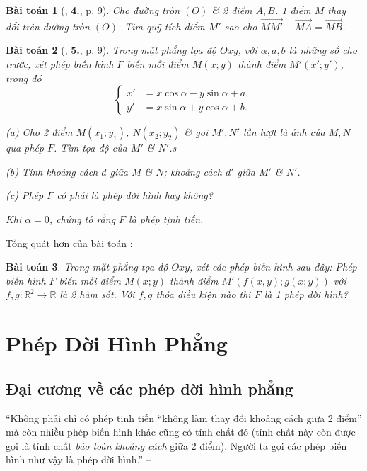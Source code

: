 \documentclass[oneside]{book}
\numberwithin{equation}{section}
\newtheorem{baitoan}{Bài toán}[section]
\begin{document}
\begin{baitoan}[\cite{SGK_Toan_11_hinh_hoc_nang_cao}, \textbf{4.}, p. 9]
	Cho đường tròn $(O)$ \& 2 điểm $A,B$. 1 điểm $M$ thay đổi trên đường tròn $(O)$. Tìm quỹ tích điểm $M'$ sao cho $\overrightarrow{MM'} + \overrightarrow{MA} = \overrightarrow{MB}$.
\end{baitoan}

\begin{baitoan}[\cite{SGK_Toan_11_hinh_hoc_nang_cao}, \textbf{5.}, p. 9]
	Trong mặt phẳng tọa độ $Oxy$, với $\alpha,a,b$ là những số cho trước, xét phép biến hình $F$ biến mỗi điểm $M(x;y)$ thành điểm $M'(x';y')$, trong đó
	\begin{equation*}
		\left\{\begin{split}
			x' &= x\cos\alpha - y\sin\alpha + a,\\
			y' &= x\sin\alpha + y\cos\alpha + b.
		\end{split}\right.
	\end{equation*}
	\begin{enumerate*}
		\item[(a)] Cho 2 điểm $M(x_1;y_1)$, $N(x_2;y_2)$ \& gọi $M',N'$ lần lượt là ảnh của $M,N$ qua phép $F$. Tìm tọa độ của $M'$ \& $N'$.s
		\item[(b)] Tính khoảng cách $d$ giữa $M$ \& $N$; khoảng cách $d'$ giữa $M'$ \& $N'$.
		\item[(c)] Phép $F$ có phải là phép dời hình hay không?
		\item Khi $\alpha = 0$, chứng tỏ rằng $F$ là phép tịnh tiến.
	\end{enumerate*}
\end{baitoan}
Tổng quát hơn của bài toán \cite[\textbf{6.}, p. 9]{SGK_Toan_11_hinh_hoc_nang_cao}:
\begin{baitoan}
	Trong mặt phẳng tọa độ $Oxy$, xét các phép biến hình sau đây: Phép biến hình $F$ biến mỗi điểm $M(x;y)$ thành điểm $M'(f(x,y);g(x;y))$ với $f,g:\mathbb{R}^2\to\mathbb{R}$ là 2 hàm sốt. Với $f,g$ thỏa điều kiện nào thì $F$ là 1 phép dời hình?
\end{baitoan}


\section{Phép Dời Hình Phẳng}

\subsection{Đại cương về các phép dời hình phẳng}
``Không phải chỉ có phép tịnh tiến ``không làm thay đổi khoảng cách giữa 2 điểm'' mà còn nhiều phép biến hình khác cũng có tính chất đó (tính chất này còn được gọi là tính chất \textit{bảo toàn khoảng cách} giữa 2 điểm). Người ta gọi các phép biến hình như vậy là phép dời hình.'' -- \cite[p. 8]{SGK_Toan_11_hinh_hoc_nang_cao}
\end{document}
